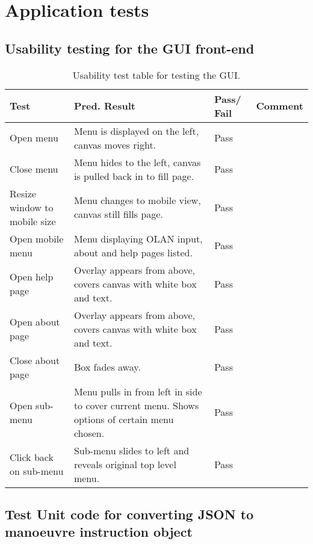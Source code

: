 \chapter{Application tests}

\section{Usability testing for the GUI front-end}
\begin{table}[h]
\begin{tabular}{|p{4.5cm}|p{4.5cm}|p{2cm}|p{2.5cm}|}
\hline
\textbf{Test} & \textbf{Pred. Result} & \textbf{Pass/ Fail} & \textbf{Comment}                        \\ \hline
Open menu    &   Menu is displayed on the left, canvas moves right. &  Pass          &    \\ \hline
Close menu    &   Menu hides to the left, canvas is pulled back in to fill page. &   Pass         &     \\ \hline
Resize window to mobile size    & Menu changes to mobile view, canvas still fills page.   & Pass           &     \\ \hline
Open mobile menu    & Menu displaying OLAN input, about and help pages listed.   &     Pass       &     \\ \hline
Open help page    &  Overlay appears from above, covers canvas with white box and text.  &       Pass     &     \\ \hline
Open about page    &  Overlay appears from above, covers canvas with white box and text.  &      Pass      &     \\ \hline
Close about page    &  Box fades away.  &      Pass      &     \\ \hline
Open sub-menu    &  Menu pulls in from left in side to cover current menu. Shows options of certain menu chosen.  &    Pass        &     \\ \hline
Click back on sub-menu    &  Sub-menu slides to left and reveals original top level menu.  &    Pass        &     \\ \hline
\end{tabular}
\label{test:canvas}
\caption{Usability test table for testing the GUI.}
\end{table}

\section{Test Unit code for converting JSON to manoeuvre instruction object}
\label{test:jsonmvoes}
\begin{figure}[h!]
\caption{}
\begin{lstlisting}
\end{lstlisting}
\end{figure}

